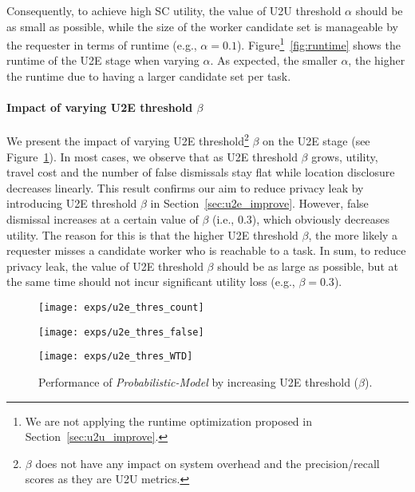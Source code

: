 \documentclass{USC-Thesis}
\numberwithin{equation}{chapter}
\begin{document}
Consequently, to achieve high SC utility, the value of U2U threshold $\alpha$ should be as small as possible, while the size of the worker candidate set is manageable by the requester in terms of runtime (e.g., $\alpha=0.1$). Figure\footnote{We are not applying the runtime optimization proposed in Section~\ref{sec:u2u_improve}.}~\ref{fig:runtime} shows the runtime of the U2E stage when varying $\alpha$. As expected, the smaller $\alpha$, the higher the runtime due to having a larger candidate set per task.

\paragraph{Impact of varying U2E threshold $\beta$}
We present the impact of varying U2E threshold\footnote{$\beta$ does not have any impact on system overhead and the precision/recall scores as they are U2U metrics.} $\beta$ on the U2E stage (see Figure~\ref{fig:vary_beta}). In most cases, we observe that as U2E threshold $\beta$ grows, utility, travel cost and the number of false dismissals stay flat while location disclosure decreases linearly. This result confirms our aim to reduce privacy leak by introducing U2E threshold $\beta$ in Section~\ref{sec:u2e_improve}.
However, false dismissal increases at a certain value of $\beta$ (i.e., 0.3), which obviously decreases utility. The reason for this is that the higher U2E threshold $\beta$, the more likely a requester misses a candidate worker who is reachable to a task.
In sum, to reduce privacy leak, the value of U2E threshold $\beta$ should be as large as possible, but at the same time should not incur significant utility loss (e.g., $\beta=0.3$).

\begin{figure}[!ht]
	\begin{minipage}[b]{0.32\linewidth}
	\centering
		\texttt{[image: exps/u2e\_thres\_count]}
		\label{fig:u2e_thres_count}
	\end{minipage}
	\begin{minipage}[b]{0.32\linewidth}
		\centering
		\texttt{[image: exps/u2e\_thres\_false]}
		\label{fig:u2e_thres_false}
	\end{minipage}
	\begin{minipage}[b]{0.32\linewidth}
	\centering
		\texttt{[image: exps/u2e\_thres\_WTD]}
		\label{fig:u2e_thres_WTD}
	\end{minipage}
	\caption{Performance of \emph{Probabilistic-Model} by increasing U2E threshold ($\beta$).}
\label{fig:vary_beta}
\end{figure}
\end{document}
